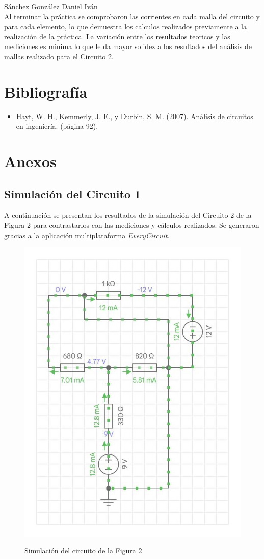 \documentclass[a4paper,12pt]{article}
\begin{document}
\vspace{1cm}

{\Large Sánchez González Daniel Iván}\\
\vspace{.3cm}
Al terminar la práctica se comprobaron las corrientes en cada malla del circuito y para cada elemento, lo que demuestra los calculos realizados previamente a la realización de la práctica. La variación entre los resultados teoricos y las mediciones es minima lo que le da mayor solidez a los resultados del análisis de mallas realizado para el Circuito 2.\par

\section{Bibliografía}

\begin{itemize}
\item Hayt, W. H., Kemmerly, J. E., y Durbin, S. M. (2007). Análisis de circuitos en ingeniería. (página 92).
\end{itemize}

\newpage
\section{Anexos}
\subsection{Simulación del Circuito 1}

A continuación se presentan los resultados de la simulación del Circuito 2 de la Figura 2 para contrastarlos con las mediciones y cálculos realizados. Se generaron gracias a la aplicación multiplataforma \textit{EveryCircuit}\texttrademark. \\


\begin{figure}[!h]
\centering
	\includegraphics[width=.8\textwidth]{fig1}
	\label{fig3}
	 \caption{Simulación del circuito de la Figura 2}
\end{figure}
\end{document}

